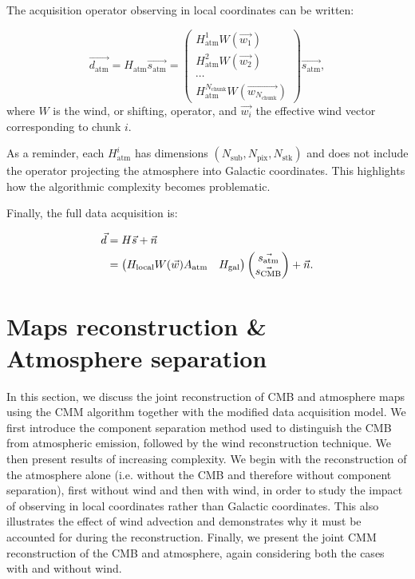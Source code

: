 \documentclass[../../thesis.tex]{subfiles}
\begin{document}
The acquisition operator observing in local coordinates can be written:

\begin{equation}
    \vec{d_\text{atm}} = H_\text{atm}\vec{s_\text{atm}} = \begin{pmatrix}
        H_{\text{atm}}^{1} W(\vec{w_1}) \\
        H_{\text{atm}}^{2} W(\vec{w_2}) \\
        \cdots \\
        H_{\text{atm}}^{N_\text{chunk}} W(\vec{w_{N_\text{chunk}}})
        \end{pmatrix} \vec{s_\text{atm}},
\end{equation}
where $W$ is the wind, or shifting, operator, and $\vec{w_i}$ the effective wind vector corresponding to chunk $i$.

As a reminder, each $H_{\text{atm}}^{i}$ has dimensions $\left(N_\text{sub}, N_\text{pix}, N_\text{stk}\right)$ and does not include the operator projecting the atmosphere into Galactic coordinates. This highlights how the algorithmic complexity becomes problematic.

Finally, the full data acquisition is:

\begin{align} \label{eq:atm_data_model}
    \vec{d} &= H\vec{s} + \vec{n} \notag \\
    &= \begin{pmatrix}
        H_\text{local} W(\vec{w}) A_\text{atm} & H_\text{gal}
    \end{pmatrix} \begin{pmatrix}
        \vec{s_\text{atm}} \\
        \vec{s_\text{CMB}}
    \end{pmatrix} + \vec{n}.
\end{align}

\section[Atmosphere Reconstruction \& Separation]{Maps reconstruction \& Atmosphere separation} \label{section:atm_reconstruction}

In this section, we discuss the joint reconstruction of CMB and atmosphere maps using the CMM algorithm together with the modified data acquisition model.
We first introduce the component separation method used to distinguish the CMB from atmospheric emission, followed by the wind reconstruction technique. We then present results of increasing complexity. We begin with the reconstruction of the atmosphere alone (i.e. without the CMB and therefore without component separation), first without wind and then with wind, in order to study the impact of observing in local coordinates rather than Galactic coordinates. This also illustrates the effect of wind advection and demonstrates why it must be accounted for during the reconstruction. Finally, we present the joint CMM reconstruction of the CMB and atmosphere, again considering both the cases with and without wind.
\end{document}
